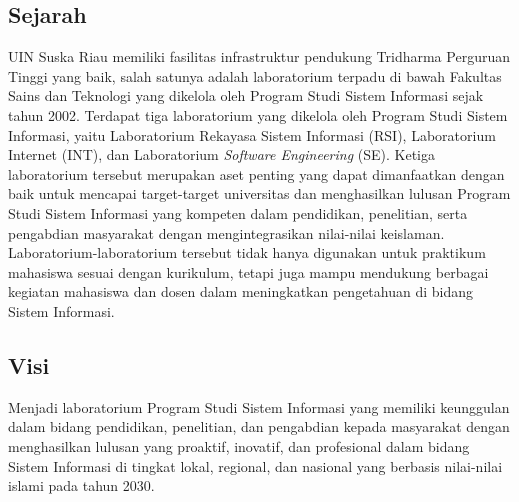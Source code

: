 \subsection{Sejarah}
UIN Suska Riau memiliki fasilitas infrastruktur pendukung Tridharma Perguruan Tinggi yang baik, salah satunya adalah laboratorium terpadu di bawah Fakultas Sains dan Teknologi yang dikelola oleh Program Studi Sistem Informasi sejak tahun 2002. Terdapat tiga laboratorium yang dikelola oleh Program Studi Sistem Informasi, yaitu Laboratorium Rekayasa Sistem Informasi (RSI), Laboratorium Internet (INT), dan Laboratorium \textit{Software Engineering} (SE). Ketiga laboratorium tersebut merupakan aset penting yang dapat dimanfaatkan dengan baik untuk mencapai target-target universitas dan menghasilkan lulusan Program Studi Sistem Informasi yang kompeten dalam pendidikan, penelitian, serta pengabdian masyarakat dengan mengintegrasikan nilai-nilai keislaman. Laboratorium-laboratorium tersebut tidak hanya digunakan untuk praktikum mahasiswa sesuai dengan kurikulum, tetapi juga mampu mendukung berbagai kegiatan mahasiswa dan dosen dalam meningkatkan pengetahuan di bidang Sistem Informasi.
\subsection{Visi}
Menjadi laboratorium Program Studi Sistem Informasi yang memiliki keunggulan dalam bidang pendidikan, penelitian, dan pengabdian kepada masyarakat dengan menghasilkan lulusan yang proaktif, inovatif, dan profesional dalam bidang Sistem Informasi di tingkat lokal, regional, dan nasional yang berbasis nilai-nilai islami pada tahun 2030.

